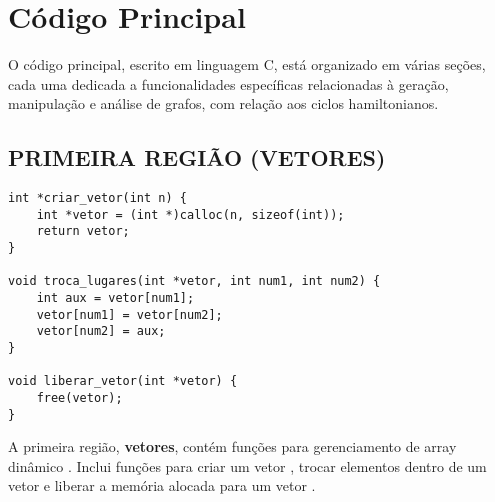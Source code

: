 \documentclass[12pt, openright, oneside, a4paper, chapter=TITLE, section=TITLE, subsection=TITLE, subsubsection=TITLE, brazil]{abntex2}
\newenvironment{codebox}%
  {\begin{mdframed}[backgroundcolor=gray!5, linecolor=gray, roundcorner=5pt]}%
  {\end{mdframed}}
\begin{document}
\section{Código Principal}
O código principal, escrito em linguagem C, está organizado em várias seções, cada uma dedicada a funcionalidades específicas relacionadas à geração, manipulação e análise de grafos, com relação aos ciclos hamiltonianos.

\subsection{PRIMEIRA REGIÃO (VETORES)}
\begin{codebox}
\begin{verbatim}
int *criar_vetor(int n) {
    int *vetor = (int *)calloc(n, sizeof(int));
    return vetor;
}

void troca_lugares(int *vetor, int num1, int num2) {
    int aux = vetor[num1];
    vetor[num1] = vetor[num2];
    vetor[num2] = aux;
}

void liberar_vetor(int *vetor) {
    free(vetor);
}
\end{verbatim}
\end{codebox}
A primeira região, \textbf{vetores}, contém funções para gerenciamento de array dinâmico . Inclui funções para criar um vetor , trocar elementos dentro de um vetor  e liberar a memória alocada para um vetor .
\end{document}
